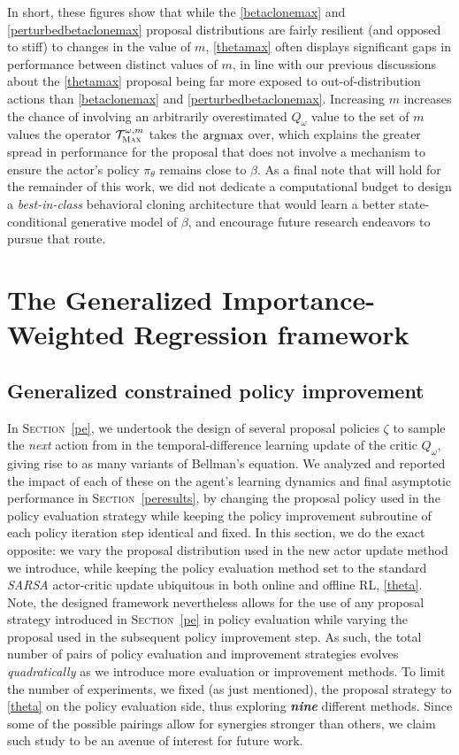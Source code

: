 In short, these figures show that while the \ref{betaclonemax} and \ref{perturbedbetaclonemax} proposal
distributions are fairly resilient (and opposed to stiff)
to changes in the value of $m$, \ref{thetamax} often displays significant gaps in performance between distinct
values of $m$, in line with our previous discussions about the \ref{thetamax} proposal being far more exposed to
out-of-distribution actions than \ref{betaclonemax} and \ref{perturbedbetaclonemax}.
Increasing $m$ increases the chance of involving an arbitrarily overestimated $Q_\omega$ value to the set
of $m$ values the operator $\mathcal{T}_\textsc{Max}^{\omega, m}$ takes the $\operatorname*{\arg\!\max}$ over,
which explains the greater spread in performance for the proposal that does not involve a mechanism to
ensure the actor's policy $\pi_\theta$ remains close to $\beta$.
As a final note that will hold for the remainder of this work,
we did not dedicate a computational budget to design a \textit{best-in-class} behavioral cloning architecture
that would learn a better state-conditional generative model of $\beta$, and encourage future research endeavors
to pursue that route.

\section{The Generalized Importance-Weighted Regression framework}
\label{pi}

\subsection{Generalized constrained policy improvement}
\label{actorupdate}
In \textsc{Section}~\ref{pe}, we undertook the design of several proposal policies $\zeta$ to
sample the \textit{next} action from in the temporal-difference learning update
\cite{Sutton1984-ce, Sutton1988-to, Sutton1999-ii}
of the critic $Q_\omega$, giving rise to as many variants of Bellman's equation.
We analyzed and reported the impact of each of these on the agent's learning dynamics and final asymptotic
performance in \textsc{Section}~\ref{peresults}, by changing the proposal policy used in the policy evaluation
strategy while keeping the policy improvement subroutine of each policy iteration step identical and fixed.
In this section, we do the exact opposite: we vary the proposal distribution used in the new actor update
method we introduce, while keeping the policy evaluation method set to the standard
\textit{SARSA} actor-critic update ubiquitous in both online and offline RL, \ref{theta}.
Note, the designed framework nevertheless allows for the use of any proposal strategy introduced
in \textsc{Section}~\ref{pe} in policy evaluation while varying the proposal used in the subsequent policy
improvement step. As such, the total number of pairs of policy evaluation and improvement strategies
evolves \emph{quadratically} as we introduce more evaluation or improvement methods.
To limit the number of experiments, we fixed (as just mentioned),
the proposal strategy to \ref{theta} on the policy evaluation side,
thus exploring \textbf{\emph{nine}} different methods.
Since some of the possible pairings allow for synergies stronger than others, we claim such study to
be an avenue of interest for future work.

